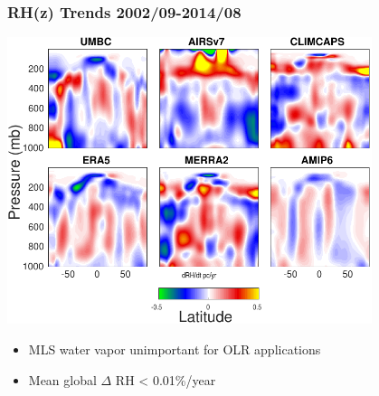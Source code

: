 \documentclass[10pt,t]{beamer}
\begin{document}
\begin{frame}
\frametitle{RH(z) Trends 2002/09-2014/08}  
\vspace{-0.15in}
\begin{center}
\includegraphics[width=0.8\textwidth]{Figs2002_2014/RHz_trends_2002_2014.pdf}
\end{center}

\small
\begin{itemize}
\item MLS water vapor unimportant for OLR applications
\item Mean global \(\Delta\) RH < 0.01\%/year
\end{itemize}

\end{frame}
\end{document}
